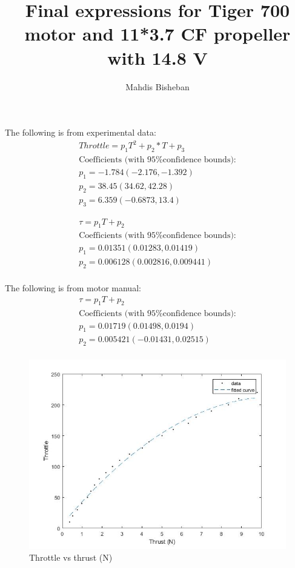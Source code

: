\documentclass[12pt, reqno]{article}
\title{\LARGE \bf
Final expressions for Tiger 700 motor and 11*3.7 CF propeller with 14.8 V}
\author{Mahdis Bisheban}
\begin{document}
\allowdisplaybreaks
\maketitle \thispagestyle{empty} \pagestyle{empty}


The following is from experimental data:
\begin{gather}
      Throttle = p_1T^2 + p_2*T + p_3\\
      \text{Coefficients (with 95\% confidence bounds):}\\
        p_1 =      -1.784  (-2.176, -1.392)\\
        p_2 =       38.45  (34.62, 42.28)\\
        p_3 =       6.359  (-0.6873, 13.4)
\end{gather}


\begin{gather}
\tau =  p_1 T + p_2\\
\text{Coefficients (with 95\% confidence bounds):}\\
p_1 =     0.01351  (0.01283, 0.01419)\\
p_2 =    0.006128  (0.002816, 0.009441)\\
\end{gather}

The following is from motor manual:
\begin{gather}
\tau = p_1 T + p_2\\
\text{Coefficients (with 95\% confidence bounds):}\\
p_1 =     0.01719  (0.01498, 0.0194)\\
p_2 =    0.005421  (-0.01431, 0.02515)\\
\end{gather}

\begin{figure}[H]
	\centering
	\includegraphics[width=0.4\columnwidth]{throttle_thrust}
	\caption{Throttle vs thrust (N)}\label{fig2}
\end{figure}
\end{document}
